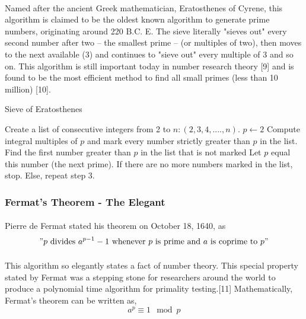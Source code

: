 \documentclass[paper=a4, fontsize=11pt]{scrartcl}	%
\numberwithin{equation}{section}		%
\numberwithin{figure}{section}		%
\numberwithin{table}{section}		%
\begin{document}
\paragraph{}Named after the ancient Greek mathematician, Eratosthenes of Cyrene, this algorithm is claimed to be the oldest known algorithm to generate prime numbers, originating around 220 B.C. E. The sieve literally "sieves out" every second number after two -- the smallest prime -- (or multiples of two), then moves to the next available (3) and continues to "sieve out" every multiple of 3 and so on. This algorithm is still important today in number research theory [9] and is found to be the most efficient method to find all small primes (less than 10 million) [10]. 

\begin{algorithm}
\caption{Sieve of Eratosthenes}
\label{alg1}
\begin{algorithmic}[1]
\STATE Create a list of consecutive integers from 2 to $n: (2, 3, 4, .... , n)$.
\STATE $p \leftarrow 2$
\STATE Compute integral multiples of $p$ and mark every number strictly greater than $p$ in the list.
\STATE Find the first number greater than $p$ in the list that is not marked
\STATE Let $p$ equal this number (the next prime).
\STATE If there are no more numbers marked in the list, stop. Else, repeat step 3.
\end{algorithmic}
\end{algorithm}

\paragraph{}

\subsubsection{Fermat's Theorem - The Elegant}
\paragraph{}Pierre de Fermat stated his theorem on October 18, 1640, as 
\["p \text{ divides } a^{p-1}-1 \text{ whenever }p\text{ is prime and }a\text{ is coprime to }p"\]
\paragraph{}This algorithm so elegantly states a fact of number theory. This special property stated by Fermat was a stepping stone for researchers around the world to produce a polynomial time algorithm for primality testing.[11] Mathematically, Fermat's theorem can be written as,
\[a^p \equiv 1 \mod p\]
\end{document}
